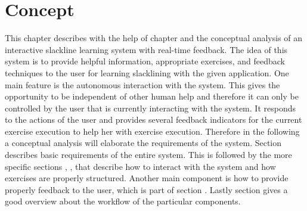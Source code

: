 \chapter{Concept}
This chapter describes with the help of chapter \textit{} and \textit{} the conceptual analysis of an interactive slackline learning system with real-time feedback. The idea of this system is to provide helpful information, appropriate exercises, and feedback techniques to the user for learning slacklining with the given application. One main feature is the autonomous interaction with the system. This gives the opportunity to be independent of other human help and therefore it can only be controlled by the user that is currently interacting with the system. It responds to the actions of the user and provides several feedback indicators for the current exercise execution to help her with exercise execution. Therefore in the following a conceptual analysis will elaborate the requirements of the system. Section \textit{} describes basic requirements of the entire system. This is followed by the more specific sections \textit{}, \textit{}, \textit{} that describe how to interact with the system and how exercises are properly structured. Another main component is how to provide properly feedback to the user, which is part of section \textit{}. Lastly section \textit{} gives a good overview about the workflow of the particular components.






